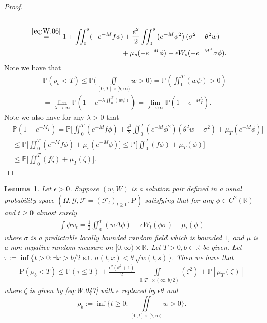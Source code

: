 \documentclass[12pt,a4paper]{amsart}
\numberwithin{equation}{section}
\theoremstyle{plain}
\newtheorem{lemma}[theorem]{Lemma}
\theoremstyle{remark}
\begin{document}
\begin{proof}
\begin{align}
\begin{multlined}
\end{multlined}
\\&\begin{multlined}
	\label{eq:W.4}\overset{\eqref{eq:W.06}}= 1 + \iint_0^s (-e^{- M} f\phi ) + \frac{\epsilon^2}{2} \iint_0^s \left(e^{-M} \phi^2\right) (\sigma^2 - \theta^2 w)
	\\ \qquad  \qquad + \mu_s(- e^{- M}\phi) + \epsilon W_s(-e^{-M^\lambda}\sigma \phi).
\end{multlined}
\end{align}
	Note we have that
\begin{align}
	&\mathbb P(\rho_b < T) \leq \mathbb P\Big(\iint\limits_{[0,T]\times [b, \infty)} w > 0 \Big)
	= \mathbb P\left(\iint_0^T (w \psi)> 0 \right)
	\\ &= \lim_{\lambda \to \infty} \mathbb P \left( 1 - e^{- \lambda\iint_0^T (w \psi) }\right) 
	= \lim_{\lambda \to \infty} \mathbb P\left( 1 - e^{- M_T^\lambda }\right).
\end{align}
	Note we also have for any $\lambda >0$ that
\begin{align}
	&\mathbb P( 1 - e^{- M_T }) = \mathbb P \Big[\iint_0^T (e^{- M} f\phi ) +\frac{\epsilon^2}{2} \iint_0^T \left(e^{-M} \phi^2\right) ( \theta^2 w - \sigma^2) + \mu_T (e^{-M}\phi)\Big]
	\\& \leq \mathbb P \Big[\iint_0^T (e^{- M} f\phi ) + \mu_s(e^{-M}\phi)\Big]
	\leq \mathbb P \Big[\iint_0^T (f\phi ) + \mu_T(\phi)\Big]
	\\& \leq \mathbb P \Big[\iint_0^T (f\zeta ) + \mu_T(\zeta)\Big].
\end{align}
\end{proof}

\begin{lemma}
	Let $\epsilon > 0$.
	Suppose $(w,W)$ is a solution pair defined in a usual probability space $(\Omega, \mathcal G,\mathcal F = (\mathcal F_t)_{t\geq 0}, \mathrm P) $ satisfying that for any $\phi\in C^2(\mathbb R)$ and $t\geq 0$ almost surely
	\begin{equation}\label{eq:W.048}\begin{multlined}
	\int \phi w_t
	= \frac{1}{2}\iint_0^t (w\Delta \phi) + \epsilon W_t(\phi\sigma) + \mu_t(\phi )
	\end{multlined}\end{equation}
	where $\sigma$ is a predictable locally bounded random field which is bounded $1$, and $\mu$ is a non-negative random measure on $[0,\infty) \times\mathbb R$.
	Let $T>0, b \in \mathbb R$ be given.
	Let $\tau := \inf\{t>0: \exists x>b/2\text{ s.t. } \sigma(t,x)< \theta \sqrt{w(t,s)}\}$.
	Then we have that
	\begin{align}
	\mathrm P( \rho_b < T) \leq \mathbb P(\tau \leq T) + \frac{\epsilon^2(\theta^2 + 1)}{2} \iint\limits_{[0,T]\times ( \infty, b/2) }(\zeta^2) + \mathbb P[\mu_T(\zeta)]
	\end{align}
	where $\zeta$ is given by  \eqref{eq:W.047} with $\epsilon$ replaced by $\epsilon \theta$ and 
	\[\rho_b := \inf\Big\{t\geq 0: \iint\limits_{[0,t]\times [b, \infty)}  w > 0\Big\}.\]
\end{lemma}
\end{document}
